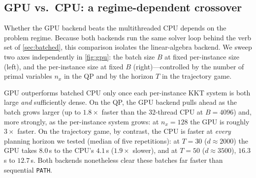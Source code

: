 \documentclass[conference]{IEEEtran}
\begin{document}
\subsection{GPU vs.\ CPU: a regime-dependent crossover}
\label{sec:exp:gpu}



Whether the GPU backend beats the multithreaded CPU depends on the problem regime.
Because both backends run the same solver loop behind the verb set of \cref{sec:batched},
this comparison isolates the linear-algebra backend. We sweep two axes independently
in \cref{fig:gpu}: the batch size $B$ at fixed per-instance size (left), and the
per-instance size at fixed $B$ (right)---controlled by the number of primal variables
$n_x$ in the QP and by the horizon $T$ in the trajectory game.

GPU outperforms batched CPU only once each per-instance KKT system is both large
\emph{and} sufficiently dense.
On the QP, the GPU backend pulls ahead as the batch grows larger (up to $1.8\times$ faster than the $32$-thread
CPU at $B = 4096$) and, more strongly, as the per-instance system grows: at $n_x = 128$ the
GPU is roughly $3\times$ faster. On the trajectory game, by contrast, the CPU is faster at
\emph{every} planning horizon we tested (median of five repetitions): at $T = 30$
($d \approx 2000$) the GPU takes $8.0$\,s to the CPU's $4.1$\,s ($1.9\times$ slower), and at
$T = 50$ ($d \approx 3500$), $16.3$\,s to $12.7$\,s. Both backends nonetheless clear these
batches far faster than sequential \texttt{PATH}.
\end{document}
